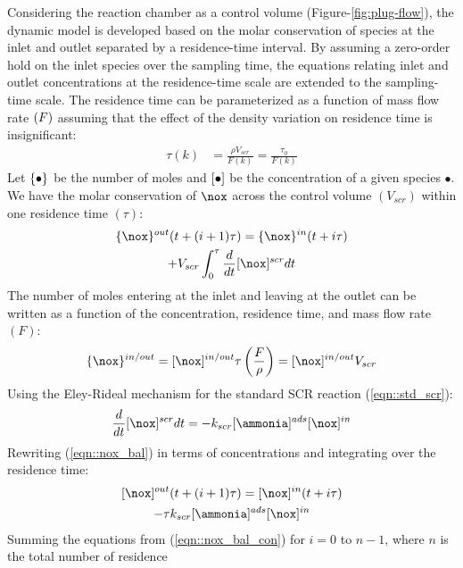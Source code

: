 Considering the reaction chamber as a control volume (Figure-\ref{fig:plug-flow}), the dynamic model is developed based
on the molar conservation of species at the inlet and outlet separated by a residence-time interval. By assuming a
zero-order hold on the inlet species over the sampling time, the equations relating inlet and outlet concentrations at
the residence-time scale are extended to the sampling-time scale. The residence time can be parameterized as a function of mass flow rate $\left( F \right)$ assuming that the effect of the density variation on residence time is insignificant:
\begin{align}
        \tau(k) & = \frac{\rho V_{scr}}{F(k)} = \frac{\tau_0}{F(k)}
        \label{eqn::res_time}
\end{align}
Let $\left\{ \bullet \right\}$ be the number of moles and $\left[ \bullet \right]$ be the concentration of a given species $\bullet$. We have the molar conservation of $\nox$ across the control volume $(V_{scr})$ within one residence time $(\tau)$:
\begin{multline}
        \mol{\nox}^{out} (t + (i+1) \tau) =
        \mol{\nox}^{in} (t + i \tau) \\
        + V_{scr} \int_0^{\tau} \frac{d}{dt} \con{\nox}^{scr}dt
        \label{eqn::nox_bal}
\end{multline}
The number of moles entering at the inlet and leaving at the outlet can be written as a function of the concentration, residence time, and mass flow rate $(F)$:
\begin{align}
        \mol{\nox}^{in/out} = \con{\nox}^{in/out} \tau \lr{\frac{F}{\rho}} = \con{\nox}^{in/out} V_{scr}
\end{align}
Using the Eley-Rideal mechanism for the standard SCR reaction (\ref{eqn::std_scr}):
\begin{align}
        \frac{d}{dt} \con{\nox}^{scr}dt = -k_{scr} \con{\ammonia}^{ads} \con{\nox}^{in}
\end{align}
Rewriting (\ref{eqn::nox_bal}) in terms of concentrations and integrating over the residence time:
\begin{multline}
        \con{\nox}^{out} (t + (i+1) \tau) =
        \con{\nox}^{in} (t + i \tau) \\
        -\tau k_{scr} \con{\ammonia}^{ads} \con{\nox}^{in}
        \label{eqn::nox_bal_con}
\end{multline}
Summing the equations from (\ref{eqn::nox_bal_con}) for  $i = 0$ to $n-1$, where $n$ is the total number of residence
